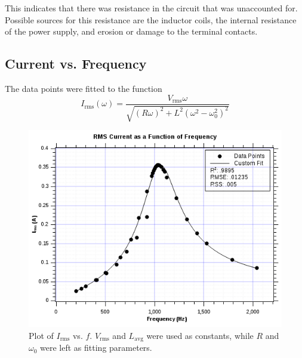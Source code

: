 \documentclass[twocolumn,english]{IEEEtran}
\theoremstyle{plain}
\theoremstyle{plain}
\begin{document}
This indicates that there was resistance in the circuit that was unaccounted for. Possible sources for this resistance are the inductor coils, the internal resistance of the power supply, and erosion or damage to the terminal contacts.

\hrulefill

\subsection{Current vs. Frequency}


The data points were fitted to the function
\begin{equation}
	I_{\text{rms}}(\omega)
	= \frac
	{V_{\text{rms}}\omega}
	{\sqrt{(R\omega)^2 +L^2(\omega^2-\omega_0^2)^2}}
\end{equation}

\begin{figure}[H]
	\begin{centering}
	\begin{center}
	\includegraphics[width=\linewidth]{./Images/Part3.png}
	\caption{Plot of $I_{\text{rms}}$ vs. $f$. $V_{\text{rms}}$ and $L_{\text{avg}}$ were used as constants, while $R$ and $\omega_0$ were left as fitting parameters.}
	\label{fig:IvsFreq}
	\end{center}
	\par\end{centering}
\end{figure}
\end{document}
